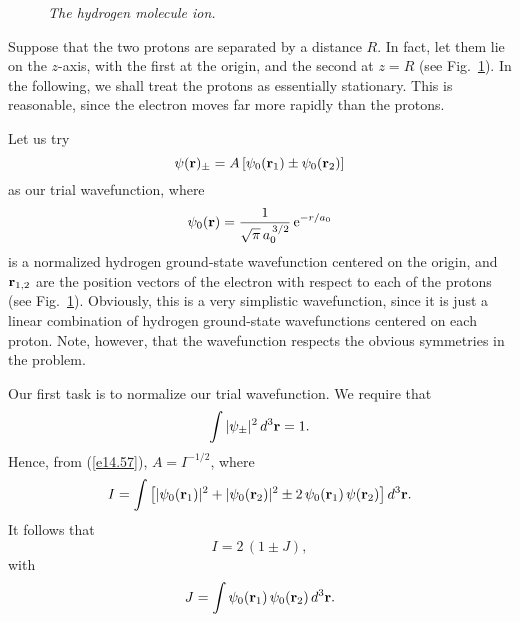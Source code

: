 \begin{figure}
\epsfysize=3.5in
\centerline{}
\caption{\em The hydrogen molecule ion.}\label{fh2p}   
\end{figure}

Suppose that the two protons are separated by a distance $R$. In fact, let them lie on the $z$-axis, with the first at the origin, and
the second at $z=R$ (see Fig.~\ref{fh2p}). In the following, we shall treat the
protons as essentially stationary. This is reasonable, since the electron
moves far more rapidly than the protons.

Let us try
\begin{equation}\label{e14.57}
\psi({\bf r})_\pm = A\left[\psi_0({\bf r}_1) \pm \psi_0({\bf r}_2)\right]
\end{equation}
as our trial wavefunction, where
\begin{equation}
\psi_0({\bf r}) = \frac{1}{\sqrt{\pi}\,a_0^{\,3/2}}\,{\rm e}^{-r/a_0}
\end{equation}
is a normalized hydrogen ground-state wavefunction centered on the origin, and ${\bf r}_{1,2}$ are
 the position vectors of the electron with respect to each of the protons
(see Fig.~\ref{fh2p}). Obviously, this is a very simplistic wavefunction,
since it is just  a linear combination of hydrogen ground-state
wavefunctions centered on each proton. Note, however, that the wavefunction  respects
the obvious symmetries in the problem.

Our first task is to normalize our trial wavefunction. We require that
\begin{equation}
\int |\psi_\pm|^2\,d^3{\bf r} = 1.
\end{equation}
Hence, from (\ref{e14.57}),
$A = I^{-1/2}$, where
\begin{equation}
I = \int\left[|\psi_0({\bf r}_1)|^2 + |\psi_0({\bf r}_2)|^2 \pm
2\,\psi_0({\bf r}_1)\,\psi({\bf r}_2)\right] d^3{\bf r}.
\end{equation}
It follows that
\begin{equation}
I = 2\,(1\pm J),
\end{equation}
with
\begin{equation}
J = \int \psi_0({\bf r}_1)\,\psi_0({\bf r}_2)\,d^3{\bf r}.
\end{equation}

